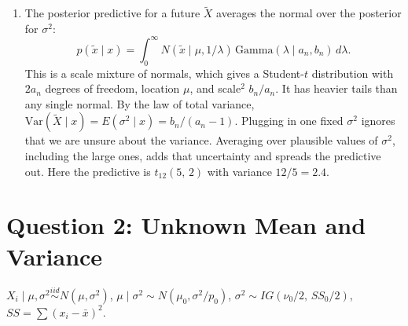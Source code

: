 \documentclass[11pt]{article}
\begin{document}
\begin{enumerate}
\item The posterior predictive for a future $\tilde X$ averages the normal over the posterior for $\sigma^2$:
\[
p(\tilde x \mid x) = \int_0^\infty N(\tilde x \mid \mu, 1/\lambda)\,\text{Gamma}(\lambda \mid a_n, b_n)\,d\lambda .
\]
This is a scale mixture of normals, which gives a Student-$t$ distribution with $2a_n$ degrees of freedom, location $\mu$, and scale$^2$ $b_n/a_n$. It has heavier tails than any single normal. By the law of total variance, $\text{Var}(\tilde X \mid x) = E(\sigma^2 \mid x) = b_n/(a_n-1)$. Plugging in one fixed $\sigma^2$ ignores that we are unsure about the variance. Averaging over plausible values of $\sigma^2$, including the large ones, adds that uncertainty and spreads the predictive out. Here the predictive is $t_{12}(5,\, 2)$ with variance $12/5 = 2.4$.
\end{enumerate}

\section*{Question 2: Unknown Mean and Variance}

$X_i \mid \mu,\sigma^2 \overset{iid}{\sim} N(\mu,\sigma^2)$, $\mu \mid \sigma^2 \sim N(\mu_0, \sigma^2/p_0)$, $\sigma^2 \sim IG(\nu_0/2,\, SS_0/2)$, $SS = \sum(x_i-\bar x)^2$.
\end{document}
